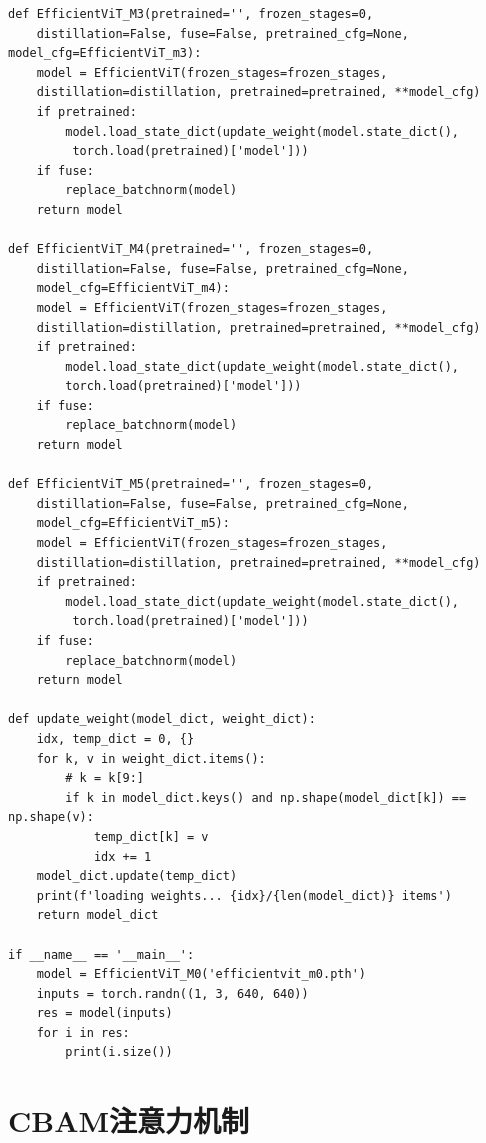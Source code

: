 \documentclass[12pt]{ctexart}
\begin{document}
\begin{lstlisting}
def EfficientViT_M3(pretrained='', frozen_stages=0, 
    distillation=False, fuse=False, pretrained_cfg=None, model_cfg=EfficientViT_m3):
    model = EfficientViT(frozen_stages=frozen_stages, 
    distillation=distillation, pretrained=pretrained, **model_cfg)
    if pretrained:
        model.load_state_dict(update_weight(model.state_dict(),
         torch.load(pretrained)['model']))
    if fuse:
        replace_batchnorm(model)
    return model
    
def EfficientViT_M4(pretrained='', frozen_stages=0,
    distillation=False, fuse=False, pretrained_cfg=None,
    model_cfg=EfficientViT_m4):
    model = EfficientViT(frozen_stages=frozen_stages,
    distillation=distillation, pretrained=pretrained, **model_cfg)
    if pretrained:
        model.load_state_dict(update_weight(model.state_dict(), 
        torch.load(pretrained)['model']))
    if fuse:
        replace_batchnorm(model)
    return model
 
def EfficientViT_M5(pretrained='', frozen_stages=0, 
    distillation=False, fuse=False, pretrained_cfg=None, 
    model_cfg=EfficientViT_m5):
    model = EfficientViT(frozen_stages=frozen_stages, 
    distillation=distillation, pretrained=pretrained, **model_cfg)
    if pretrained:
        model.load_state_dict(update_weight(model.state_dict(),
         torch.load(pretrained)['model']))
    if fuse:
        replace_batchnorm(model)
    return model
 
def update_weight(model_dict, weight_dict):
    idx, temp_dict = 0, {}
    for k, v in weight_dict.items():
        # k = k[9:]
        if k in model_dict.keys() and np.shape(model_dict[k]) == np.shape(v):
            temp_dict[k] = v
            idx += 1
    model_dict.update(temp_dict)
    print(f'loading weights... {idx}/{len(model_dict)} items')
    return model_dict
 
if __name__ == '__main__':
    model = EfficientViT_M0('efficientvit_m0.pth')
    inputs = torch.randn((1, 3, 640, 640))
    res = model(inputs)
    for i in res:
        print(i.size())
\end{lstlisting}

\section{CBAM注意力机制} 
\end{document}
